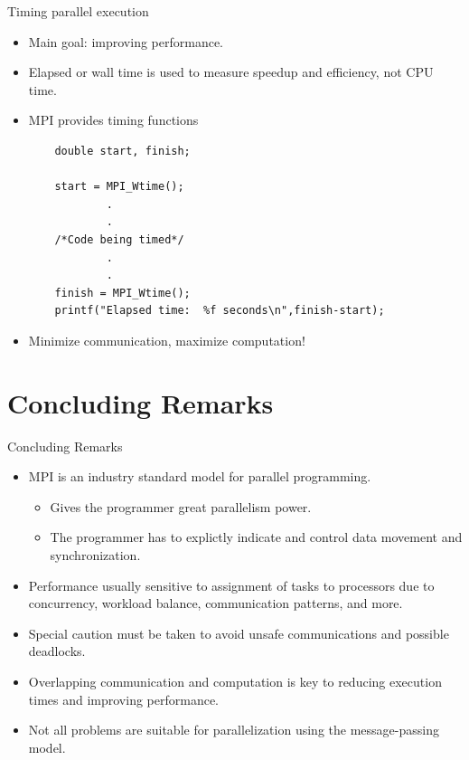 \begin{frame}[fragile]{Timing parallel execution}

\begin{itemize}
\item Main goal: improving performance. 
\item Elapsed or wall time is used to measure speedup and efficiency, not CPU time. 
\item MPI provides timing functions

    \begin{lstlisting}
    double start, finish;
    
    start = MPI_Wtime();
            .
            .
    /*Code being timed*/
            .
            .
    finish = MPI_Wtime();
    printf("Elapsed time:  %f seconds\n",finish-start);
    \end{lstlisting}

\item Minimize communication, maximize computation! 
\end{itemize}

\end{frame}

\section{Concluding Remarks}

\begin{frame}{Concluding Remarks}

\begin{itemize}
\item MPI is an industry standard model for parallel programming.
    \begin{itemize}
    \item Gives the programmer great parallelism power.
    \item The programmer has to explictly indicate and control data movement and synchronization. 
    \end{itemize}
\item Performance usually sensitive to assignment of tasks to processors due to concurrency, workload balance, communication patterns, and more.
\item Special caution must be taken to avoid unsafe communications and possible deadlocks. 
\item Overlapping communication and computation is key to reducing execution times and improving performance. 
\item Not all problems are suitable for parallelization using the message-passing model.
\end{itemize}

\end{frame}

